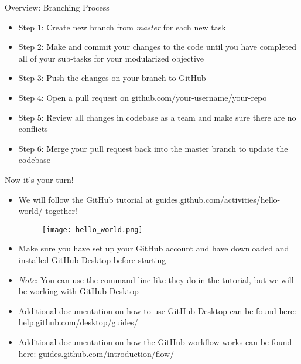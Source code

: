 \documentclass{beamer}
\begin{document}
\begin{frame}{Overview: Branching Process}
\begin{itemize}
    \item Step 1: Create new branch from \textit{master} for each new task
    \item Step 2: Make and commit your changes to the code until you have completed all of your sub-tasks for your modularized objective
    \item Step 3: Push the changes on your branch to GitHub
    \item Step 4: Open a pull request on github.com/your-username/your-repo 
    \item Step 5: Review all changes in codebase as a team and make sure there are no conflicts
    \item Step 6: Merge your pull request back into the master branch to update the codebase
\end{itemize}
\end{frame}

\begin{frame}{Now it's your turn!}
\begin{itemize}
    \item We will follow the GitHub tutorial at guides.github.com/activities/hello-world/ together!
        \begin{figure}
        \texttt{[image: hello\_world.png]}
        \end{figure}
    \item Make sure you have set up your GitHub account and have downloaded and installed GitHub Desktop before starting
    \item \textit{Note}: You can use the command line like they do in the tutorial, but we will be working with GitHub Desktop
    \item Additional documentation on how to use GitHub Desktop can be found here: help.github.com/desktop/guides/
    \item Additional documentation on how the GitHub workflow works can be found here: guides.github.com/introduction/flow/
\end{itemize}
\end{frame}
\end{document}
